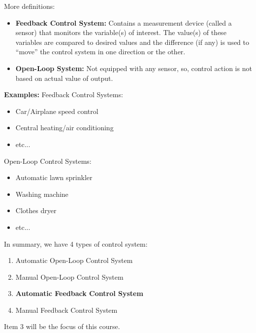 \documentclass{book}
\begin{document}
More definitions:
\begin{itemize}
	\item \textbf{Feedback Control System:} Contains a measurement device (called a sensor) that monitors the variable(s) of interest. The value(s) of these variables are compared to desired values and the difference (if any) is used to ``move'' the control system in one direction or the other.
	\item \textbf{Open-Loop System:} Not equipped with any sensor, so, control action is not based on actual value of output.
\end{itemize}
\textbf{Examples:}
Feedback Control Systems:
\begin{itemize}
	\item Car/Airplane speed control
	\item Central heating/air conditioning
	\item etc...
\end{itemize}
Open-Loop Control Systems:
\begin{itemize}
	\item Automatic lawn sprinkler
	\item Washing machine
	\item Clothes dryer
	\item etc...
\end{itemize}

In summary, we have 4 types of control system:
\begin{enumerate}
	\item Automatic Open-Loop Control System
	\item Manual Open-Loop Control System
	\item \textbf{Automatic Feedback Control System}
	\item Manual Feedback Control System
\end{enumerate}
Item 3 will be the focus of this course.
\end{document}
